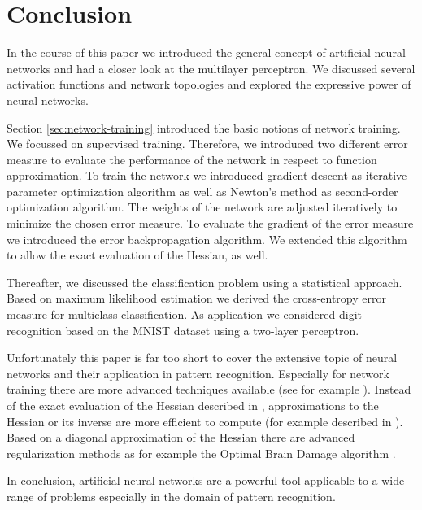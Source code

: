 \section{Conclusion}

In the course of this paper we introduced the general concept of artificial neural networks and had a closer look at the multilayer perceptron. We discussed several activation functions and network topologies and explored the expressive power of neural networks.

Section \ref{sec:network-training} introduced the basic notions of network training. We focussed on supervised training. Therefore, we introduced two different error measure to evaluate the performance of the network in respect to function approximation. To train the network we introduced gradient descent as iterative parameter optimization algorithm as well as Newton's method as second-order optimization algorithm. The weights of the network are adjusted iteratively to minimize the chosen error measure. To evaluate the gradient of the error measure we introduced the error backpropagation algorithm. We extended this algorithm to allow the exact evaluation of the Hessian, as well.

Thereafter, we discussed the classification problem using a statistical approach. Based on maximum likelihood estimation we derived the cross-entropy error measure for multiclass classification. As application we considered digit recognition based on the MNIST dataset using a two-layer perceptron.

Unfortunately this paper is far too short to cover the extensive topic of neural networks and their application in pattern recognition. Especially for network training there are more advanced techniques available (see for example \cite{Bishop:1995}). Instead of the exact evaluation of the Hessian described in \cite{Bishop:1992}, approximations to the Hessian or its inverse are more efficient to compute (for example described in \cite{Bishop:1995}). Based on a diagonal approximation of the Hessian there are advanced regularization methods as for example the Optimal Brain Damage algorithm \cite{LeCunDenkerSolla:1990}.

In conclusion, artificial neural networks are a powerful tool applicable to a wide range of problems especially in the domain of pattern recognition.